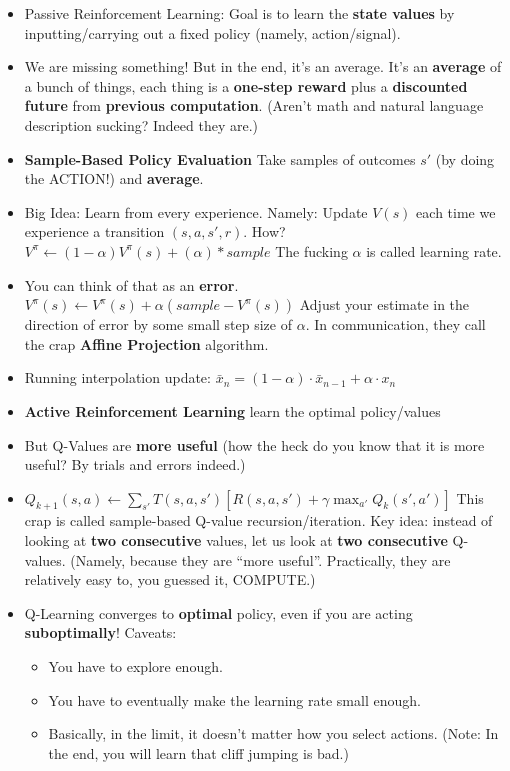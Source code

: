 \documentclass[twocolumn]{article}
\begin{document}
\begin{itemize}
\item Passive Reinforcement Learning: Goal is to learn the
  \textbf{state values} by inputting/carrying out a fixed policy
  (namely, action/signal).
\item We are missing something! But in the end, it's an average. It's
  an \textbf{average} of a bunch of things, each thing is a
  \textbf{one-step reward} plus a \textbf{discounted future} from
  \textbf{previous computation}. (Aren't math and natural language
  description sucking? Indeed they are.)
\item \textbf{Sample-Based Policy Evaluation} Take samples of outcomes
  $s'$ (by doing the ACTION!) and \textbf{average}.
\item Big Idea: Learn from every experience. Namely: Update $V(s)$
  each time we experience a transition $(s,a,s',r)$. How?
  $V^{\pi}\leftarrow (1-\alpha)V^{\pi}(s)+(\alpha)*sample$ The fucking
  $\alpha$ is called learning rate.
\item You can think of that as an
  \textbf{error}. $V^{\pi}(s)\leftarrow V^{\pi}(s)+\alpha (sample -
  V^{\pi}(s))$ Adjust your estimate in  the direction of error by some
  small step size of $\alpha$. In communication, they call the crap
  \textbf{Affine Projection} algorithm.
\item Running interpolation update: $\bar{x}_{n}=(1-\alpha)\cdot
  \bar{x}_{n-1}+\alpha\cdot x_{n}$
\item \textbf{Active Reinforcement Learning} {\color{red} learn the
    optimal policy/values}
\item But Q-Values are \textbf{more useful} (how the heck do you know
  that it is more useful? By trials and errors indeed.)
\item
  $Q_{k+1}(s,a)\leftarrow\sum_{s'}T(s,a,s')[R(s,a,s')+\gamma\displaystyle{\max_{a'}}Q_{k}(s',a')]$
  This crap is called sample-based Q-value recursion/iteration. Key
  idea: instead of looking at \textbf{two consecutive} {\color{red}
    values}, let us look at \textbf{two consecutive}
  Q-values. (Namely, because they are ``more useful''. Practically,
  they are relatively easy to, you guessed it, COMPUTE.)
\item Q-Learning converges to \textbf{optimal} policy, even if you are
  acting \textbf{suboptimally}! Caveats:
  \begin{itemize}
  \item You have to explore enough.
  \item You have to eventually make the learning rate small enough.
  \item Basically, in the limit, it doesn't matter how you select
    actions. (Note: In the end, you will learn that cliff jumping is
    bad.)
  \end{itemize}
\end{itemize}
\end{document}
